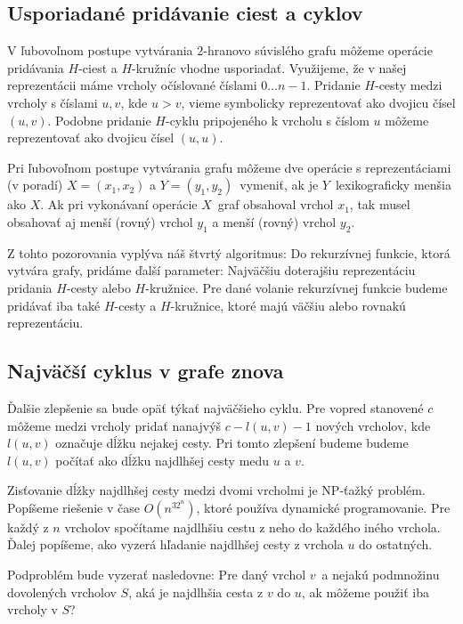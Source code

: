 \subsection{Usporiadané pridávanie ciest a cyklov}

V ľubovoľnom postupe vytvárania $2$-hranovo súvislého grafu môžeme operácie pridávania $H$-ciest
a $H$-kružníc vhodne usporiadať. Využijeme, že v našej reprezentácii máme vrcholy očíslované
číslami $0 \ldots n-1$. Pridanie $H$-cesty medzi vrcholy s číslami $u, v$, kde $u > v$, vieme symbolicky
reprezentovať ako dvojicu čísel $(u,v)$. Podobne pridanie $H$-cyklu pripojeného k vrcholu s číslom $u$
môžeme reprezentovať ako dvojicu čísel $(u,u)$.

Pri ľubovoľnom postupe vytvárania grafu môžeme dve operácie s reprezentáciami (v poradí)
$X = (x_1,x_2)$ a $Y = (y_1, y_2)$ vymeniť, ak je $Y$ lexikograficky menšia ako $X$. Ak pri
vykonávaní operácie $X$ graf obsahoval vrchol $x_1$, tak musel obsahovať aj menší (rovný) vrchol $y_1$
a menší (rovný) vrchol $y_2$.

Z tohto pozorovania vyplýva náš štvrtý algoritmus: Do rekurzívnej funkcie, ktorá vytvára grafy,
pridáme ďalší parameter: Najväčšiu doterajšiu reprezentáciu pridania $H$-cesty alebo $H$-kružnice.
Pre dané volanie rekurzívnej funkcie budeme pridávať iba také $H$-cesty a $H$-kružnice, ktoré
majú väčšiu alebo rovnakú reprezentáciu.

\subsection{Najväčší cyklus v grafe znova}

Ďalšie zlepšenie sa bude opäť týkať najväčšieho cyklu. Pre vopred stanovené $c$ môžeme medzi vrcholy
pridať nanajvýš $c - l(u,v) - 1$ nových vrcholov, kde $l(u,v)$ označuje dĺžku nejakej cesty. Pri
tomto zlepšení budeme budeme $l(u,v)$ počítať ako dĺžku najdlhšej cesty medu $u$ a $v$.

Zisťovanie dĺžky najdlhšej cesty medzi dvomi vrcholmi je NP-ťažký problém. Popíšeme riešenie
v čase $O(n^32^n)$, ktoré používa dynamické programovanie. Pre každý z $n$ vrcholov spočítame
najdlhšiu cestu z neho do každého iného vrchola. Ďalej popíšeme, ako vyzerá hľadanie najdlhšej
cesty z vrchola $u$ do ostatných.

Podproblém bude vyzerať nasledovne: Pre daný vrchol $v$ a nejakú podmnožinu dovolených
vrcholov $S$, aká je najdlhšia cesta z $v$ do $u$, ak môžeme použiť iba vrcholy v $S$?


